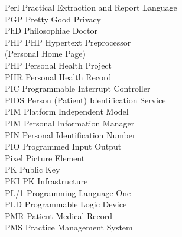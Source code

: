 \begin{tabbing}
    \>Perl \>\>Practical Extraction and Report Language\\

    \>PGP \>\>Pretty Good Privacy\\


    \>PhD \>\>Philosophiae Doctor\\

    \>PHP \>\>PHP Hypertext Preprocessor\\
        \>\>\>(Personal Home Page)\\

    \>PHP \>\>Personal Health Project\\

    \>PHR \>\>Personal Health Record\\

    \>PIC \>\>Programmable Interrupt Controller\\


    \>PIDS \>\>Person (Patient) Identification Service\\

    \>PIM \>\>Platform Independent Model\\

    \>PIM \>\>Personal Information Manager\\

    \>PIN \>\>Personal Identification Number\\

    \>PIO \>\>Programmed Input Output\\

    \>Pixel \>\>Picture Element\\

    \>PK \>\>Public Key\\

    \>PKI \>\>PK Infrastructure\\

    \>PL/1 \>\>Programming Language One\\

    \>PLD \>\>Programmable Logic Device\\

    \>PMR \>\>Patient Medical Record\\

    \>PMS \>\>Practice Management System\\


\end{tabbing}
